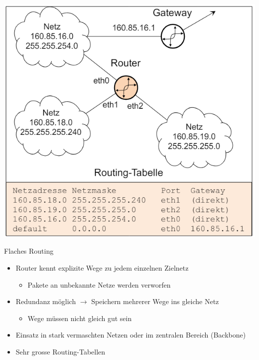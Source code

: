 \begin{example}
    \begin{center}
    \includegraphics[width=0.65\linewidth]{images/bsp_routing_tabelle.png}
    \end{center}
\end{example}

\begin{concept}{Flaches Routing}
    \begin{itemize}
        \item Router kennt explizite Wege zu jedem einzelnen Zielnetz
        \begin{itemize}
            \item Pakete an unbekannte Netze werden verworfen
        \end{itemize}
        \item Redundanz möglich $\rightarrow$ Speichern mehrerer Wege ins gleiche Netz
        \begin{itemize}
            \item Wege müssen nicht gleich gut sein
        \end{itemize}
        \item Einsatz in stark vermaschten Netzen oder im zentralen Bereich (Backbone)
        \item Sehr grosse Routing-Tabellen
    \end{itemize}
\end{concept}


